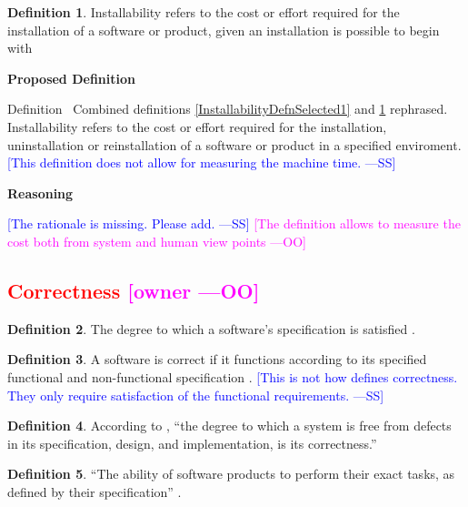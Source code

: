 \documentclass[letterpaper,cleveref]{lipics-v2019}
\newcommand{\authornote}[3]{\textcolor{#1}{[#3 ---#2]}}
\newcommand{\authornote}[3]{}
\newcommand{\wss}[1]{\authornote{blue}{SS}{#1}} %
\newcommand{\oo}[1]{\authornote{magenta}{OO}{#1}} %
\newcommand{\notdone}[1]{\textcolor{red}{#1}}
\theoremstyle{definition}
\newtheorem{defn}{Definition}
\begin{document}
\begin{defn} \label{InstallabilityDefnSelected2}
	 Installability refers to the cost or effort required for the installation of a software or product, given an installation is possible to begin with \citep{lenhard2013measuring}
\end{defn}

\noindent \textbf{Proposed Definition}

Definition~ Combined definitions \ref{InstallabilityDefnSelected1} and \ref{InstallabilityDefnSelected2} rephrased.
Installability refers to the cost or effort required for the installation, uninstallation or reinstallation of a software or product in a specified enviroment.  \wss{This definition does not allow for
  measuring the machine time.}

\noindent \textbf{Reasoning}

\wss{The rationale is missing.  Please add.}
\oo{The definition allows to measure the cost both from system and human view points}

\subsection{\notdone{Correctness} \oo{owner}}

\begin{defn}
  The degree to which a software's specification is satisfied
  \citep{berander2005software}.
\end{defn}

\begin{defn} \label{CorrectDefnSelected} 
  A software is correct if it functions according to its specified functional
  and non-functional specification \citep{GhezziEtAl2003}.  \wss{This is not how
    \citet{GhezziEtAl2003} defines correctness.  They only require satisfaction
    of the functional requirements.}

\end{defn}

\begin{defn}
  According to \citet{wilson2009quality}, ``the degree to which a system is free
  from defects in its specification, design, and implementation, is its
  correctness.''
\end{defn}

\begin{defn}
  ``The ability of software products to perform their exact tasks, as defined by
  their specification'' \citep{meyer1988object}.
\end{defn}
\end{document}
